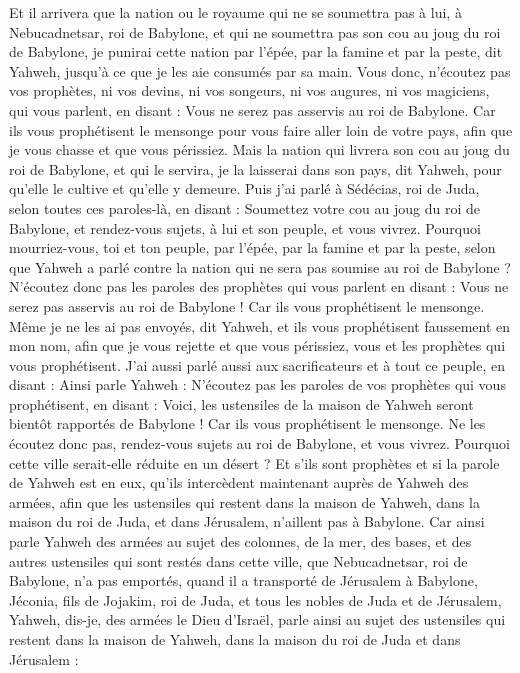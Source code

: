 \begin{multicols}{2}
Et il arrivera que la nation ou le royaume qui ne se soumettra pas à lui, à Nebucadnetsar, roi de Babylone, et qui ne soumettra pas son cou au joug du roi de Babylone, je punirai cette nation par l'épée, par la famine et par la peste, dit Yahweh, jusqu'à ce que je les aie consumés par sa main.
Vous donc, n'écoutez pas vos prophètes, ni vos devins, ni vos songeurs, ni vos augures, ni vos magiciens, qui vous parlent, en disant : Vous ne serez pas asservis au roi de Babylone.
Car ils vous prophétisent le mensonge pour vous faire aller loin de votre pays, afin que je vous chasse et que vous périssiez.
Mais la nation qui livrera son cou au joug du roi de Babylone, et qui le servira, je la laisserai dans son pays, dit Yahweh, pour qu'elle le cultive et qu'elle y demeure.
Puis j'ai parlé à Sédécias, roi de Juda, selon toutes ces paroles-là, en disant : Soumettez votre cou au joug du roi de Babylone, et rendez-vous sujets, à lui et son peuple, et vous vivrez.
Pourquoi mourriez-vous, toi et ton peuple, par l'épée, par la famine et par la peste, selon que Yahweh a parlé contre la nation qui ne sera pas soumise au roi de Babylone ?
N'écoutez donc pas les paroles des prophètes qui vous parlent en disant : Vous ne serez pas asservis au roi de Babylone ! Car ils vous prophétisent le mensonge.
Même je ne les ai pas envoyés, dit Yahweh, et ils vous prophétisent faussement en mon nom, afin que je vous rejette et que vous périssiez, vous et les prophètes qui vous prophétisent.
J'ai aussi parlé aussi aux sacrificateurs et à tout ce peuple, en disant : Ainsi parle Yahweh : N'écoutez pas les paroles de vos prophètes qui vous prophétisent, en disant : Voici, les ustensiles de la maison de Yahweh seront bientôt rapportés de Babylone ! Car ils vous prophétisent le mensonge.
Ne les écoutez donc pas, rendez-vous sujets au roi de Babylone, et vous vivrez. Pourquoi cette ville serait-elle réduite en un désert ?
Et s'ils sont prophètes et si la parole de Yahweh est en eux, qu'ils intercèdent maintenant auprès de Yahweh des armées, afin que les ustensiles qui restent dans la maison de Yahweh, dans la maison du roi de Juda, et dans Jérusalem, n'aillent pas à Babylone.
Car ainsi parle Yahweh des armées au sujet des colonnes, de la mer, des bases, et des autres ustensiles qui sont restés dans cette ville,
que Nebucadnetsar, roi de Babylone, n'a pas emportés, quand il a transporté de Jérusalem à Babylone, Jéconia, fils de Jojakim, roi de Juda, et tous les nobles de Juda et de Jérusalem,
Yahweh, dis-je, des armées le Dieu d'Israël, parle ainsi au sujet des ustensiles qui restent dans la maison de Yahweh, dans la maison du roi de Juda et dans Jérusalem :

\end{multicols}
